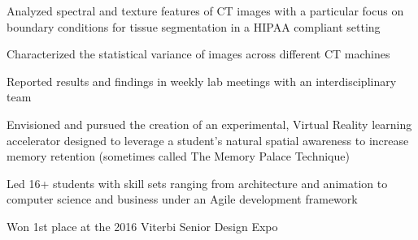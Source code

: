 \documentclass[letterpaper]{deedy-resume} %
\begin{document}
\begin{minipage}[t]{0.66\textwidth}

\sectionspace %



\begin{tightitemize}
\item Analyzed spectral and texture features of CT images with a particular focus on boundary conditions for tissue segmentation in a HIPAA compliant setting
\item Characterized the statistical variance of images across different CT machines 
\item Reported results and findings in weekly lab meetings with an interdisciplinary team 
\end{tightitemize}

\sectionspace 


\begin{tightitemize}
\item Envisioned and pursued the creation of an experimental, Virtual Reality learning accelerator designed to leverage a student's natural spatial awareness to increase memory retention (sometimes called The Memory Palace Technique)
\item Led 16+ students with skill sets ranging from architecture and animation to computer science and business under an Agile development framework
\item Won 1st place at the 2016 Viterbi Senior Design Expo 
\end{tightitemize}


\end{minipage}
\end{document}
